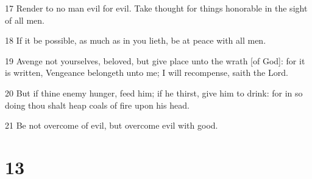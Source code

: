\par 17 Render to no man evil for evil. Take thought for things honorable in the sight of all men.
\par 18 If it be possible, as much as in you lieth, be at peace with all men.
\par 19 Avenge not yourselves, beloved, but give place unto the wrath [of God]: for it is written, Vengeance belongeth unto me; I will recompense, saith the Lord.
\par 20 But if thine enemy hunger, feed him; if he thirst, give him to drink: for in so doing thou shalt heap coals of fire upon his head.
\par 21 Be not overcome of evil, but overcome evil with good.

\chapter{13}

